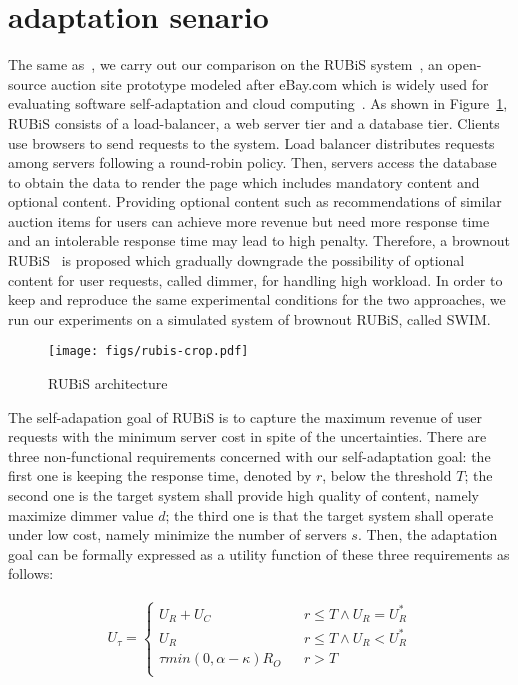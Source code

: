\documentclass[sigconf]{acmart}
\begin{document}
	\section{adaptation senario}
	The same as~\cite{moreno2017comparing}, we carry out our comparison on the RUBiS system~\cite{ow22013rubis}, an open-source auction site prototype modeled after eBay.com which is widely used for evaluating software self-adaptation and cloud computing~\cite{qin2003survey,islam2015online}. As shown in Figure~\ref{fig:rubis}, RUBiS consists of a load-balancer, a web server tier and a database tier. Clients use browsers to send requests to the system. Load balancer distributes requests among servers following a round-robin policy. Then, servers access the database to obtain the data to render the page which includes mandatory content and optional content. Providing optional content such as recommendations of similar auction items for users can achieve more revenue but need more response time and an intolerable response time may lead to high penalty. Therefore, a brownout RUBiS~\cite{klein2014brownout} is proposed which gradually downgrade the possibility of optional content for user requests, called dimmer, for handling high workload. In order to keep and reproduce the same experimental conditions for the two approaches, we run our experiments on a simulated system of brownout RUBiS, called SWIM.
	
	\begin{figure}[!htp]
		\centering
		\texttt{[image: figs/rubis-crop.pdf]}
		\caption{RUBiS architecture}
		\label{fig:rubis}
	\end{figure}
	
	The self-adapation goal of RUBiS is to capture the maximum revenue of user requests with the minimum server cost in spite of the uncertainties. There are three non-functional requirements concerned with our self-adaptation goal: the first one is keeping the response time, denoted by $r$, below the threshold $T$; the second one is the target system shall provide high quality of content, namely maximize dimmer value $d$; the third one is that the target system shall operate under low cost, namely minimize the number of servers $s$. Then, the adaptation goal can be formally expressed as a utility function of these three requirements as follows:
	
	\begin{equation}
	\begin{aligned}
	U_{\tau}=\left\{
	\begin{array}{rcl}
	U_{R}+U_{C} & & { r\leq T\wedge U_{R}=U_{R}^{*}} \\
	U_{R} & & {r\leq T\wedge U_{R}<U_{R}^{*}}\\
	\tau min(0,\alpha-\kappa)R_{O} & & {r>T}\\
	\end{array} \right.
	\end{aligned}
	\end{equation}
	
\end{document}
